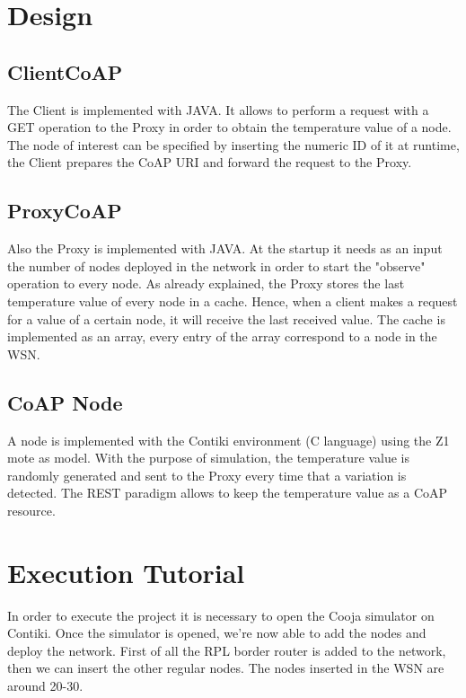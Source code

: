 \documentclass[10pt,english, openany]{book}
\begin{document}
\chapter{Design}
\section{ClientCoAP}
The Client is implemented with JAVA. It allows to perform a request with a GET operation to the Proxy in order to obtain the temperature value of a node. The node of interest can be specified by inserting the numeric ID of it at runtime, the Client prepares the CoAP URI and forward the request to the Proxy.

\section{ProxyCoAP}
Also the Proxy is implemented with JAVA. At the startup it needs as an input the number of nodes deployed in the network in order to start the "observe" operation to every node. 
As already explained, the Proxy stores the last temperature value of every node in a cache. Hence, when a client makes a request for a value of a certain node, it will receive the last received value.
The cache is implemented as an array, every entry of the array correspond to a node in the WSN.

\section{CoAP Node}
A node is implemented with the Contiki environment (C language) using the Z1 mote as model. 
With the purpose of simulation, the temperature value is randomly generated and sent to the Proxy every time that a variation is detected.
The REST paradigm allows to keep the temperature value as a CoAP resource.

\chapter{Execution Tutorial}
In order to execute the project it is necessary to open the Cooja simulator on Contiki. Once the simulator is opened, we're now able to add the nodes and deploy the network. First of all the RPL border router is added to the network, then we can insert the other regular nodes. The nodes inserted in the WSN are around 20-30.
\end{document}
